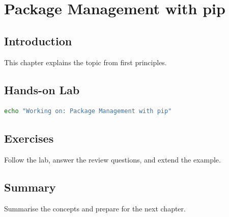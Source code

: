 \chapter{Package Management with pip}
\label{chap:vol2-14}



\section{Introduction}
This chapter explains the topic from first principles.

\section{Hands-on Lab}
\begin{lstlisting}[language=bash]
echo "Working on: Package Management with pip"
\end{lstlisting}

\section{Exercises}
\begin{exercise}
Follow the lab, answer the review questions, and extend the example.
\end{exercise}

\section{Summary}
Summarise the concepts and prepare for the next chapter.
